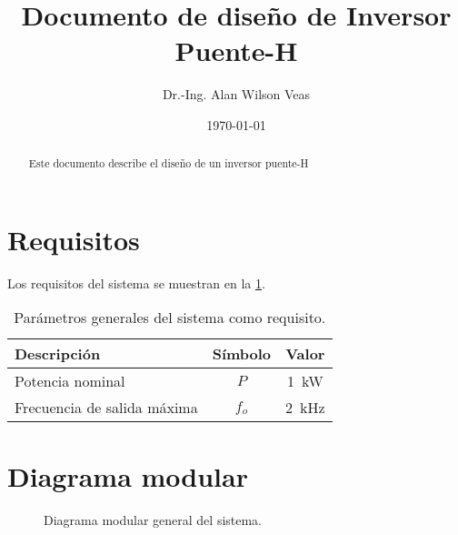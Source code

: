 \documentclass[peerreview,spanish]{IEEEtran}
\begin{document}
\title{%
	Documento de diseño de Inversor Puente-H%
}
\author{%
	Dr.-Ing. Alan Wilson Veas%
}
\date{\today}

\maketitle
\tableofcontents
\listoffigures
\listoftables

\IEEEpeerreviewmaketitle
\begin{abstract}
Este documento describe el diseño de un inversor puente-H

\end{abstract}

\section{Requisitos}

Los requisitos del sistema se muestran en la \ref{tab:requisitos}.

\Blindtext[1][1]

\begin{table}
	\caption{Parámetros generales del sistema como requisito.}
	\label{tab:requisitos}
	\centering
	\begin{tabular}{lcc}
		\toprule
		Descripción & Símbolo & Valor \\
		\midrule
		Potencia nominal & $P$ & \qty{1}{\kilo\watt}\\
		Frecuencia de salida máxima & $f_{o}$ & \qty{2}{\kilo\hertz}\\
		\bottomrule
	\end{tabular}
\end{table}

\section{Diagrama modular}

\begin{figure}
	\centering
	
	\label{fig:modulos}
	\caption{Diagrama modular general del sistema.}
\end{figure}
\end{document}
